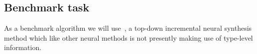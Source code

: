 \documentclass{article}
\begin{document}
\subsection{Benchmark task}


As a benchmark algorithm we will use~\cite{nsps}, a top-down incremental neural synthesis method which like other neural methods is not presently making use of type-level information.

\end{document}
